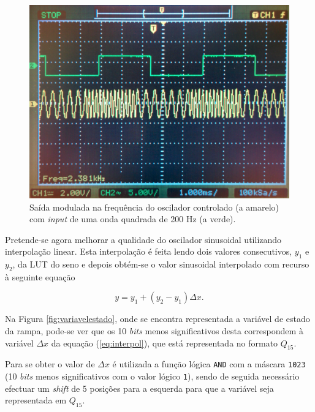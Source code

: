 \documentclass[11pt]{article}
\numberwithin{equation}{section}
\begin{document}
\begin{figure}[H]
	\centering
	\includegraphics[keepaspectratio=true, scale=0.10]{exps/200Hz_2_6}
	\caption{Saída modulada na frequência do oscilador controlado (a amarelo) com \textit{input} de uma onda quadrada de 200 Hz (a verde).}
	\vspace{-0.8em}
\end{figure}

Pretende-se agora melhorar a qualidade do oscilador sinusoidal utilizando interpolação linear. Esta interpolação é feita lendo dois valores consecutivos, $y_{1}$ e $y_{2}$, da LUT do seno e depois obtém-se o valor sinusoidal interpolado com recurso à seguinte equação

\vspace{-3mm}
\begin{equation}
	y = y_{1} + (y_{2} - y_{1})\Delta x.
	\label{eq:interpol}
\end{equation}

\vspace{1mm}
Na Figura \ref{fig:variavelestado}, onde se encontra representada a variável de estado da rampa, pode-se ver que os 10 \textit{bits} menos significativos desta correspondem à variável $\Delta x$ da equação (\ref{eq:interpol}), que está representada no formato $Q_{15}$.

Para se obter o valor de $\Delta x$ é utilizada a função lógica \texttt{AND} com a máscara \texttt{1023} (10 \textit{bits} menos significativos com o valor lógico \texttt{1}), sendo de seguida necessário efectuar um \textit{shift} de 5 posições para a esquerda para que a variável seja representada em $Q_{15}$.
\end{document}
